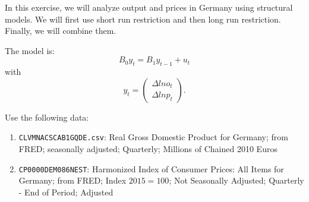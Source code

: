 In this exercise, we will analyze output and prices in Germany using structural \var{} models. We will first use short run restriction and then long run restriction. Finally, we will combine them.

The model is:
\[ B_0 y_t = B_1 y_{t-1} + u_t \]
with
\[ y_t = \begin{pmatrix} \Delta ln o_t \\ \Delta ln p_t \end{pmatrix}. \]

Use the following data:
\begin{enumerate}[label=-]
    \item \verb|CLVMNACSCAB1GQDE.csv|: Real Gross Domestic Product for Germany; from FRED; seasonally adjusted; Quarterly; Millions of Chained 2010 Euros

    \item \verb|CP0000DEM086NEST|: Harmonized Index of Consumer Prices: All Items for Germany; from FRED; Index $2015=100$; Not Seasonally Adjusted; Quarterly - End of Period; Adjusted
\end{enumerate}



